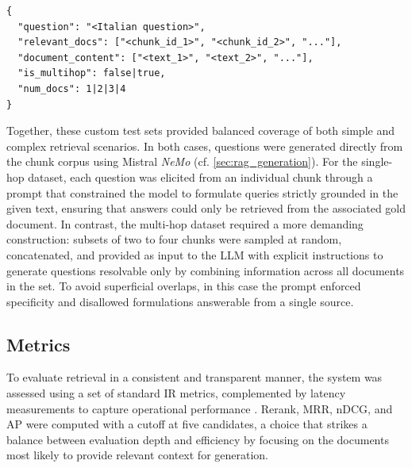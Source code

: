 \begin{spacing}{1.5}
\vspace{0.6em}

\begin{lstlisting}[frame=none,
                   caption={JSON output format for combined dataset items, including single-hop and multi-hop questions.},
                   captionpos=b,
                   label={lst:combined-set-example},
  xleftmargin=0.05\textwidth,
  xrightmargin=0.05\textwidth]
{
  "question": "<Italian question>",
  "relevant_docs": ["<chunk_id_1>", "<chunk_id_2>", "..."],
  "document_content": ["<text_1>", "<text_2>", "..."],
  "is_multihop": false|true,
  "num_docs": 1|2|3|4
}
\end{lstlisting}
\vspace{0.6em}

Together, these custom test sets provided balanced coverage of both simple and complex retrieval scenarios. In both cases, questions were generated directly from the chunk corpus using Mistral \textit{NeMo} (cf. \autoref{sec:rag_generation}). For the single-hop dataset, each question was elicited from an individual chunk through a prompt that constrained the model to formulate queries strictly grounded in the given text, ensuring that answers could only be retrieved from the associated gold document. In contrast, the multi-hop dataset required a more demanding construction: subsets of two to four chunks were sampled at random, concatenated, and provided as input to the LLM with explicit instructions to generate questions resolvable only by combining information across all documents in the set. To avoid superficial overlaps, in this case the prompt enforced specificity and disallowed formulations answerable from a single source.


\subsection{Metrics}\label{sec:metrics}
To evaluate retrieval in a consistent and transparent manner, the system was assessed using a set of standard IR metrics, complemented by latency measurements to capture operational performance \citep{wang_searching_2024}.
Rerank, MRR, nDCG, and AP were computed with a cutoff at five candidates, a choice that strikes a balance between evaluation depth and efficiency by focusing on the documents most likely to provide relevant context for generation.


\end{spacing}
